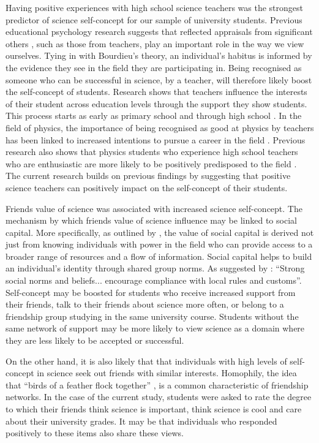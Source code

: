 Having positive experiences with high school science teachers was the strongest predictor of science self-concept for our sample of university students. Previous educational psychology research suggests that reflected appraisals from significant others \cite{bong2003academic}, such as those from teachers, play an important role in the way we view ourselves. Tying in with Bourdieu's theory, an individual's habitus is informed by the evidence they see in the field they are participating in. Being recognised as someone who can be successful in science, by a teacher, will therefore likely boost the self-concept of students. Research shows that teachers influence the interests of their student across education levels through the support they show students. This process starts as early as primary school \cite{fauth2014student} and through high school \cite{Hazari2017}.  In the field of physics, the importance of being recognised as good at physics by teachers has been linked to increased intentions to pursue a career in the field \cite{Hazari2017}. Previous research also shows that physics students who experience high school teachers who are enthusiastic are more likely to be positively predisposed to the field \cite{keller2017impact}. The current research builds on previous findings by suggesting that positive science teachers can positively impact on the self-concept of their students.

Friends value of science was associated with increased science self-concept. The mechanism by which friends value of science influence may be linked to social capital. More specifically, as outlined by \cite{lin1999building}, the value of social capital is derived not just from knowing individuals with power in the field who can provide access to a broader range of resources and a flow of information. Social capital helps to build an individual's identity through shared group norms. As suggested by \cite[p.29]{Adler2017}: ``Strong social norms and beliefs... encourage compliance with local rules and customs''. Self-concept may be boosted for students who receive increased support from their friends, talk to their friends about science more often, or belong to a friendship group studying in the same university course. Students without the same network of support may be more likely to view science as a domain where they are less likely to be accepted or successful. 

On the other hand, it is also likely that that individuals with high levels of self-concept in science seek out friends with similar interests. Homophily, the idea that ``birds of a feather flock together'' \cite{mcpherson2001birds}, is a common characteristic of friendship networks. In the case of the current study, students were asked to rate the degree to which their friends think science is important, think science is cool and care about their university grades. It may be that individuals who responded positively to these items also share these views. 

